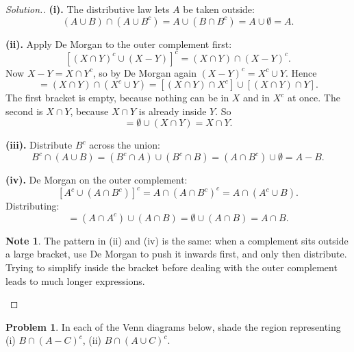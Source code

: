 \documentclass[11pt,a4paper]{article}
\theoremstyle{definition}
\newtheorem{note}[thm]{Note}
\newtheorem{problemx}{Problem}[section]
\newenvironment{problem}{\begin{problemx}}{\end{problemx}}
\newenvironment{solution}
  {\renewcommand{\qedsymbol}{}\begin{proof}[\textit{Solution}.]}
  {\end{proof}}
\begin{document}
\begin{solution}
\textbf{(i).} The distributive law lets $A$ be taken outside:
$$(A\cup B)\cap\left(A\cup B^c\right)=A\cup\left(B\cap B^c\right)=A\cup\emptyset=A.$$

\textbf{(ii).} Apply De Morgan to the outer complement first:
$$\left[(X\cap Y)^c\cup(X-Y)\right]^c=(X\cap Y)\cap(X-Y)^c.$$
Now $X-Y=X\cap Y^c$, so by De Morgan again $(X-Y)^c=X^c\cup Y$. Hence
$$=(X\cap Y)\cap\left(X^c\cup Y\right)
=\left[(X\cap Y)\cap X^c\right]\cup\left[(X\cap Y)\cap Y\right].$$
The first bracket is empty, because nothing can be in $X$ and in $X^c$ at once. The
second is $X\cap Y$, because $X\cap Y$ is already inside $Y$. So
$$=\emptyset\cup(X\cap Y)=X\cap Y.$$

\textbf{(iii).} Distribute $B^c$ across the union:
$$B^c\cap(A\cup B)=\left(B^c\cap A\right)\cup\left(B^c\cap B\right)
=\left(A\cap B^c\right)\cup\emptyset=A-B.$$

\textbf{(iv).} De Morgan on the outer complement:
$$\left[A^c\cup\left(A\cap B^c\right)\right]^c=A\cap\left(A\cap B^c\right)^c
=A\cap\left(A^c\cup B\right).$$
Distributing:
$$=\left(A\cap A^c\right)\cup(A\cap B)=\emptyset\cup(A\cap B)=A\cap B.$$

\begin{note}
The pattern in (ii) and (iv) is the same: when a complement sits outside a large
bracket, use De Morgan to push it inwards first, and only then distribute. Trying to
simplify inside the bracket before dealing with the outer complement leads to much
longer expressions.
\end{note}
\end{solution}

\begin{problem}
In each of the Venn diagrams below, shade the region representing
\quad (i) $B\cap(A-C)^c$, \quad (ii) $B\cap(A\cup C)^c$.
\end{problem}
\end{document}
